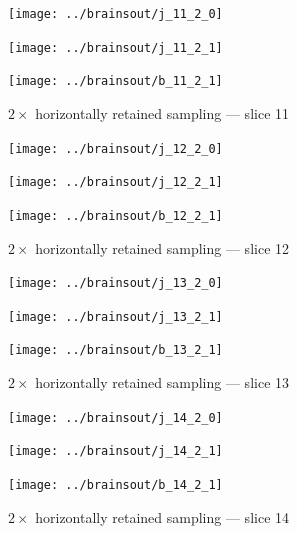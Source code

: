 \documentclass{article}
\begin{document}
\begin{figure}
\begin{centering}

\parbox{\imsizes}{\texttt{[image: ../brainsout/j\_11\_2\_0]}}

\vspace{\vertseps}

\parbox{\imsizes}{\texttt{[image: ../brainsout/j\_11\_2\_1]}}
\hfill
\parbox{\imsizes}{\texttt{[image: ../brainsout/b\_11\_2\_1]}}

\end{centering}
\caption{$2\times$ horizontally retained sampling --- slice 11}
\end{figure}


\begin{figure}
\begin{centering}

\parbox{\imsizes}{\texttt{[image: ../brainsout/j\_12\_2\_0]}}

\vspace{\vertseps}

\parbox{\imsizes}{\texttt{[image: ../brainsout/j\_12\_2\_1]}}
\hfill
\parbox{\imsizes}{\texttt{[image: ../brainsout/b\_12\_2\_1]}}

\end{centering}
\caption{$2\times$ horizontally retained sampling --- slice 12}
\end{figure}


\begin{figure}
\begin{centering}

\parbox{\imsizes}{\texttt{[image: ../brainsout/j\_13\_2\_0]}}

\vspace{\vertseps}

\parbox{\imsizes}{\texttt{[image: ../brainsout/j\_13\_2\_1]}}
\hfill
\parbox{\imsizes}{\texttt{[image: ../brainsout/b\_13\_2\_1]}}

\end{centering}
\caption{$2\times$ horizontally retained sampling --- slice 13}
\end{figure}


\begin{figure}
\begin{centering}

\parbox{\imsizes}{\texttt{[image: ../brainsout/j\_14\_2\_0]}}

\vspace{\vertseps}

\parbox{\imsizes}{\texttt{[image: ../brainsout/j\_14\_2\_1]}}
\hfill
\parbox{\imsizes}{\texttt{[image: ../brainsout/b\_14\_2\_1]}}

\end{centering}
\caption{$2\times$ horizontally retained sampling --- slice 14}
\end{figure}
\end{document}
